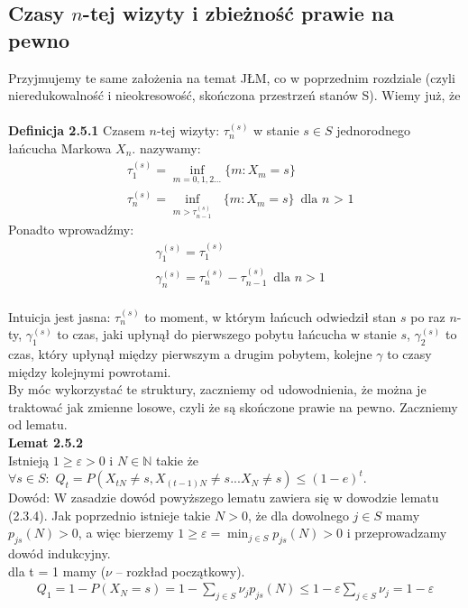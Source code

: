 \documentclass[a4paper]{article}
\begin{document}
\subsection{Czasy $n$-tej wizyty i zbieżność prawie na pewno}
Przyjmujemy te same założenia na temat JŁM, co w poprzednim rozdziale (czyli nieredukowalność i nieokresowość, skończona przestrzeń stanów S). Wiemy już, że \\
\\
\textbf{Definicja 2.5.1}
Czasem $n$-tej wizyty:  $\tau_n^{(s)}$  w stanie $s \in S$ jednorodnego łańcucha Markowa $X_n$. nazywamy:\\
\begin{align*}
&\tau_1^{(s)} = \inf_{m = 0,1,2...} \{m: X_m = s\}\\
&\tau_n^{(s)} = \inf_{m > \tau_{n-1}^{(s)}} \,\,\,\,\{m: X_m = s\} \,\,\, \text{dla $n$ > 1}
\end{align*}
Ponadto wprowadźmy:
\begin{align*}
    &\gamma_1^{(s)} = \tau_1^{(s)}\\
    &\gamma_n^{(s)} = \tau_n^{(s)} - \tau_{n-1}^{(s)}\,\,\,\text{dla $n > 1$}
\end{align*}
\\
Intuicja jest jasna: $\tau_n^{(s)}$ to moment, w którym łańcuch odwiedził stan $s$ po raz $n$-ty, $\gamma_1^{(s)}$ to czas, jaki upłynął do pierwszego pobytu łańcucha w stanie $s$, $\gamma_2^{(s)}$ to czas, który upłynął między pierwszym a drugim pobytem, kolejne $\gamma$ to czasy między kolejnymi powrotami.\\
By móc wykorzystać te struktury, zaczniemy od udowodnienia, że można je traktować jak zmienne losowe, czyli że są skończone prawie na pewno. Zaczniemy od lematu. \\
\textbf{Lemat 2.5.2}
\\ Istnieją $1 \geq \varepsilon > 0$ i $N \in \mathbb{N}$ takie że $\forall s \in S: \,\, Q_t = P(X_{tN} \neq s, X_{(t-1)N} \neq s ... X_N \neq s) \leq (1-e)^t$.\\
Dowód: W zasadzie dowód powyższego lematu zawiera się w dowodzie lematu (2.3.4). Jak poprzednio istnieje takie $N > 0$, że dla dowolnego $j \in S$ mamy $p_{js}(N) > 0$, a więc bierzemy $1 \geq \varepsilon = \min_{j \in S} p_{js}(N) > 0$ i przeprowadzamy dowód indukcyjny.\\
dla t = 1 mamy ($\nu$ – rozkład początkowy).\\
\begin{align*}
Q_1 = 1 - P(X_N = s) = 1 - \sum _{j \in S} \nu_jp_{js}(N) \leq 1 - \varepsilon \sum _{j \in S} \nu_j = 1 - \varepsilon
\end{align*}
\end{document}
